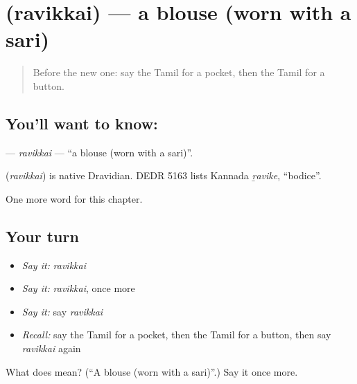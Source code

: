 \section[\texorpdfstring{\ta{ரவிக்கை} (ravikkai)}{ரவிக்கை (ravikkai)}]{ (ravikkai) — a blouse (worn with a sari)}

\label{lesson:TA-C242-ravikkai}



\begin{quote}
Before the new one: say the Tamil for a pocket, then the Tamil for a button.
\end{quote}

\subsection*{You'll want to know: }
\textbf{} — \emph{ravikkai} — \textquotedblleft{}a blouse (worn with a sari)\textquotedblright{}.

\begin{cousinweb}
\textbf{} (\emph{ravikkai}) is native Dravidian. DEDR 5163 lists Kannada \emph{ṟavike}, \textquotedblleft{}bodice\textquotedblright{}.
\end{cousinweb}

\begin{grammarlens}[title={What you've built}]
One more word for this chapter.
\end{grammarlens}

\subsection*{Your turn}
\begin{itemize}
\raggedright
  \item \emph{Say it:} \emph{ravikkai}
  \item \emph{Say it:} \emph{ravikkai}, once more
  \item \emph{Say it:} say \emph{ravikkai}
  \item \emph{Recall:} say the Tamil for a pocket, then the Tamil for a button, then say \emph{ravikkai} again
\end{itemize}

\begin{tcolorbox}[breakable,colback=teal!4,colframe=teal!35!black,title={Before you move on}]
What does  mean? (\textquotedblleft{}A blouse (worn with a sari)\textquotedblright{}.) Say it once more.
\end{tcolorbox}
